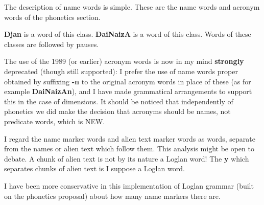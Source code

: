 \documentclass[12pt]{book}
\begin{document}
The description of name words is simple.  These are the name words and acronym words of the phonetics section. 

{\bf Djan} is a word of this class.  {\bf DaiNaizA} is a word of this class.  Words of these classes are followed by pauses.

 The use of the 1989 (or earlier) acronym words is now in my mind {\bf strongly\/} deprecated
(though still supported):  I prefer the use of name words proper obtained by suffixing {\bf -n} to the original acronym words in place of these (as for example {\bf DaiNaizAn}), and I have made grammatical arrangements to support this in the case of dimensions.  It should be noticed that independently of phonetics we did make the decision that acronyms should be names, not predicate words, which is NEW.

I regard the name marker words and alien text marker words as words, separate from the names or alien text  which follow them.  This analysis might be open to debate.  A chunk of alien text is not by its nature a Loglan word!  The {\bf y} which separates chunks of alien text is I suppose a Loglan word.

I have been more conservative in this implementation of Loglan grammar (built on the phonetics proposal) about how many name markers there are.
\end{document}

